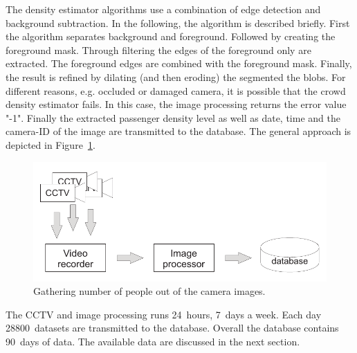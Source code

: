The density estimator algorithms use a combination of edge detection and background subtraction. In the  following, the algorithm is described briefly.
First the algorithm separates background and foreground. Followed by creating the foreground mask.
Through filtering the edges of the foreground only are extracted. The foreground edges are combined with the foreground mask. Finally, the result is refined by dilating (and then eroding) the segmented the blobs. %
For different reasons, e.g. occluded or damaged camera, it is possible that the crowd density estimator fails. In this case, the image processing returns the error value "-1".
Finally the extracted passenger density level as well as date, time and the camera-ID of the image are transmitted to the database. The general approach is depicted in Figure~\ref{fig:CCTVimageProcessing}.

\begin{figure}[htbp]
  \centering
  \includegraphics[width=\linewidth]{Figures/imageProcessing.pdf} 
  \caption{Gathering number of people out of the camera images.}
  \label{fig:CCTVimageProcessing}
\end{figure}

The CCTV and image processing runs 24~hours, 7~days a week. Each day 28800~datasets are transmitted to the database. Overall the database contains 90~days of data. The available data are discussed in the next section.

